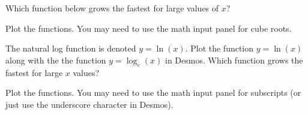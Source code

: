 \documentclass{ximera}
\begin{document}
\begin{question}
Which function below grows the fastest for large values of $x$?

    \begin{hint}
      Plot the functions. You may need to use the math input panel for cube roots.
    \end{hint}
    \begin{multipleChoice}
    \end{multipleChoice}

\end{question}

\begin{question}
The natural log function is denoted $y=\ln(x)$. Plot the function $y=\ln(x)$ along with the the function $y=\log_e(x)$ in Desmos. Which function grows the fastest for large $x$ values?

    \begin{hint}
      Plot the functions.  You may need to use the math input panel for subscripts (or just use the underscore character in Desmos).
    \end{hint}
    \begin{multipleChoice}
    \end{multipleChoice}

\end{question}
\end{document}
